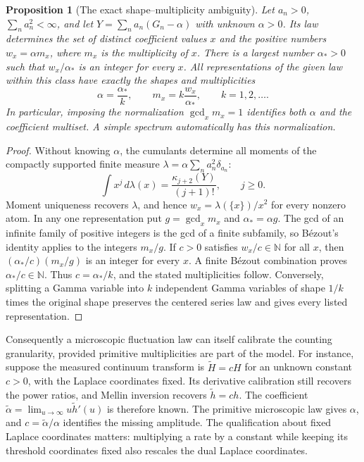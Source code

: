 \documentclass[11pt,letterpaper]{article}
\newtheorem{proposition}[theorem]{Proposition}
\theoremstyle{definition}
\theoremstyle{remark}
\newcommand{\1}{\mathbf 1}
\begin{document}
\begin{proposition}[The exact shape--multiplicity ambiguity]
\label{p06:prop:shape-multiplicity-ambiguity}
Let $a_n>0$, $\sum_n a_n^2<\infty$, and let
$Y=\sum_n a_n(G_n-\alpha)$ with unknown $\alpha>0$.
Its law determines the set of distinct coefficient values $x$ and
the positive numbers $w_x=\alpha m_x$, where $m_x$ is the multiplicity
of $x$.  There is a largest number $\alpha_*>0$ such that
$w_x/\alpha_*$ is an integer for every $x$.  All representations of
the given law within this class have exactly the shapes and
multiplicities
\[
 \alpha=\frac{\alpha_*}{k},\qquad
 m_x=k\frac{w_x}{\alpha_*},\qquad k=1,2,\ldots.
\]
In particular, imposing the normalization $\gcd_xm_x=1$ identifies
both $\alpha$ and the coefficient multiset.  A simple spectrum
automatically has this normalization.
\end{proposition}

\begin{proof}
Without knowing $\alpha$, the cumulants determine all moments of
the compactly supported finite measure
$\lambda=\alpha\sum_n a_n^2\delta_{a_n}$:
\[
 \int x^j\,d\lambda(x)=\frac{\kappa_{j+2}(Y)}{(j+1)!},
 \qquad j\ge0.
\]
Moment uniqueness recovers $\lambda$, and hence
$w_x=\lambda(\{x\})/x^2$ for every nonzero atom.
In any one representation put $g=\gcd_x m_x$ and
$\alpha_*=\alpha g$.  The gcd of an infinite family of positive
integers is the gcd of a finite subfamily, so B\'ezout's identity
applies to the integers $m_x/g$.  If $c>0$ satisfies
$w_x/c\in\mathbb N$ for all $x$, then
$(\alpha_*/c)(m_x/g)$ is an integer for every $x$.  A finite
B\'ezout combination proves $\alpha_*/c\in\mathbb N$.
Thus $c=\alpha_*/k$, and the stated multiplicities follow.
Conversely, splitting a Gamma variable into $k$ independent Gamma
variables of shape $1/k$ times the original shape preserves the
centered series law and gives every listed representation.
\end{proof}

Consequently a microscopic fluctuation law can itself calibrate the
counting granularity, provided primitive multiplicities are part of
the model.  For instance, suppose the measured continuum transform is
$\widetilde H=cH$ for an unknown constant $c>0$, with the Laplace
coordinates fixed.  Its derivative calibration still recovers the
power ratios, and Mellin inversion recovers $\widetilde h=ch$.
The coefficient $\widetilde\alpha=\lim_{u\to\infty}u\widetilde h'(u)$
is therefore known.  The primitive microscopic law gives $\alpha$,
and $c=\widetilde\alpha/\alpha$ identifies the missing amplitude.
The qualification about fixed Laplace coordinates matters: multiplying
a rate by a constant while keeping its threshold coordinates fixed
also rescales the dual Laplace coordinates.
\end{document}
